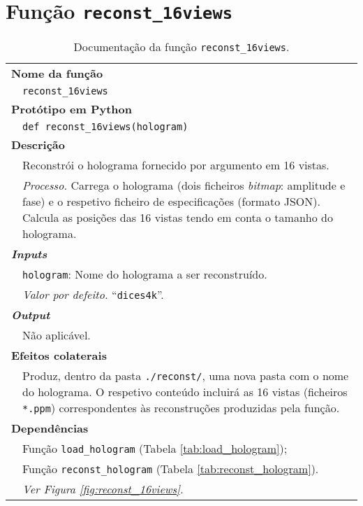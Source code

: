 
\newpage
\section{Função \texttt{reconst\_16views}}
\label{sec::doc-codigo:reconst_16views}

\begin{table}[!hp]
    \centering
    \caption{Documentação da função \texttt{reconst\_16views}.}
    \label{tab:reconst_16views}
    \begin{tabular}{p{1cm} p{11.5cm}}
        \hline
        \multicolumn{2}{l}{\bfseries\small Nome da função}\\
         & \verb|reconst_16views|\\
        \hline
        \multicolumn{2}{l}{\bfseries\small Protótipo em Python}\\
         & \texttt{def reconst_16views(hologram)} \\
        \hline\multicolumn{2}{l}{\bfseries\small Descrição}\\
         & Reconstrói o holograma fornecido por argumento em 16 vistas. \\
         & \textit{Processo.} Carrega o holograma (dois ficheiros \textit{bitmap}: amplitude e fase) e o respetivo ficheiro de especificações (formato \ac{JSON}). Calcula as posições das 16 vistas tendo em conta o tamanho do holograma.\\
        \hline\multicolumn{2}{l}{\bfseries\small \textit{Inputs}}\\
         & \verb|hologram|: Nome do holograma a ser reconstruído.\\
         & \hspace{1cm} \textit{Valor por defeito.} ``\verb|dices4k|''.\\
        \hline\multicolumn{2}{l}{\bfseries\small \textit{Output}}\\
         & Não aplicável.\\
        \hline\multicolumn{2}{l}{\bfseries\small Efeitos colaterais}\\
         & Produz, dentro da pasta \verb|./reconst/|, uma nova pasta com o nome do holograma. O respetivo conteúdo incluirá as 16 vistas (ficheiros \verb|*.ppm|) correspondentes às reconstruções produzidas pela função.\\
        \hline\multicolumn{2}{l}{\bfseries\small Dependências}\\
         & Função \verb|load_hologram| (Tabela \ref{tab:load_hologram}); \\
         & Função \verb|reconst_hologram| (Tabela \ref{tab:reconst_hologram}). \\
         & \textit{Ver Figura \ref{fig:reconst_16views}.} \\
        \hline
    \end{tabular}
\end{table}

